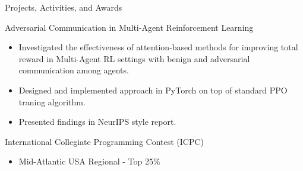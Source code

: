 \documentclass{article}
\newlength{\tabin}
\newlength{\secsep}
\newcommand{\lineunder}{\vspace*{-8pt} \\ \hspace*{-6pt} \hrulefill \\ \vspace*{-15pt}}
\newenvironment{tabbedsection}[1]{
  \begin{list}{}{
      \setlength{\itemsep}{0pt}
      \setlength{\labelsep}{0pt}
      \setlength{\labelwidth}{0pt}
      \setlength{\leftmargin}{\tabin}
      \setlength{\rightmargin}{\tabin}
      \setlength{\listparindent}{0pt}
      \setlength{\parsep}{0pt}
      \setlength{\parskip}{0pt}
      \setlength{\partopsep}{0pt}
      \setlength{\topsep}{#1}
    }
  \item[]
}{\end{list}}
\newenvironment{resume_section}[1]{
  \filbreak
  \vspace{2\secsep}
  \textsc{\large#1}
  \lineunder
  \begin{tabbedsection}{\secsep}
}{\end{tabbedsection}}
\newenvironment{resume_subsection}[2][]{
  \textbf{#2} \hfill {\footnotesize #1} \hspace{-4em}
  \begin{tabbedsection}{0.5\secsep}
}{\end{tabbedsection}}
\newenvironment{subitems}{
  \renewcommand{\labelitemi}{-}
  \begin{itemize}
      \setlength{\labelsep}{1em}
}{\end{itemize}}
\begin{document}
\begin{resume_section}{Projects, Activities, and Awards}
  
  

  \begin{resume_subsection}{Adversarial Communication in Multi-Agent Reinforcement Learning}
    \begin{subitems}
      \item Investigated the effectiveness of attention-based methods for improving total reward
      in Multi-Agent RL settings with benign and adversarial communication among agents.
      \item Designed and implemented approach in PyTorch on top of standard PPO traning algorithm. 
      \item Presented findings in NeurIPS style report.
    \end{subitems}
  \end{resume_subsection}

 \begin{resume_subsection}[Feb. 2023]{International Collegiate Programming Contest (ICPC)}
   \begin{subitems}
     \item Mid-Atlantic USA Regional - Top 25\%
   \end{subitems}
 \end{resume_subsection}


\end{resume_section}
\end{document}
